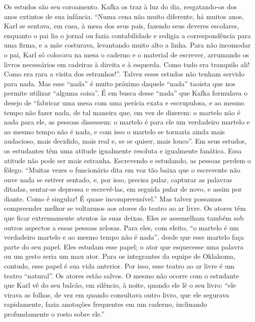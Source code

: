 Os estudos são seu coroamento. Kafka os traz à luz do dia, resgatando-os
dos anos extintos de sua infância. ``Numa cena não muito diferente, há
muitos anos, Karl se sentava, em casa, à mesa dos seus pais, fazendo
seus deveres escolares, enquanto o pai lia o jornal ou fazia
contabilidade e redigia a correspondência para uma firma, e a mãe
costurava, levantando muito alto a linha. Para não incomodar o pai, Karl
só colocava na mesa o caderno e o material de escrever, arrumando os
livros necessários em cadeiras à direita e à esquerda. Como tudo era
tranquilo ali! Como era rara a visita dos estranhos!''. Talvez esses
estudos não tenham servido para nada. Mas esse ``nada'' é muito próximo
daquele ``nada'' taoista que nos permite utilizar ``alguma coisa''. É em
busca desse ``nada'' que Kafka formulava o desejo de ``fabricar uma mesa
com uma perícia exata e escrupulosa, e ao mesmo tempo não fazer nada, de
tal maneira que, em vez de dizerem: o martelo não é nada para ele, as
pessoas dissessem: o martelo é para ele um verdadeiro martelo e ao mesmo
tempo não é nada, e com isso o martelo se tornaria ainda mais audacioso,
mais decidido, mais real e, se se quiser, mais louco''. Em seus estudos,
os estudantes têm uma atitude igualmente resoluta e igualmente fanática.
Essa atitude não pode ser mais estranha. Escrevendo e estudando, as
pessoas perdem o fôlego. ``Muitas vezes o funcionário dita em voz tão
baixa que o escrevente não ouve nada se estiver sentado, e, por isso,
precisa pular, capturar as palavras ditadas, sentar-se depressa e
escrevê-las, em seguida pular de novo, e assim por diante. Como é
singular! É quase incompreensível.'' Mas talvez possamos compreender
melhor se voltarmos aos atores do teatro ao ar livre. Os atores têm que
ficar extremamente atentos às suas deixas. Eles se assemelham também sob
outros aspectos a essas pessoas zelosas. Para eles, com efeito, ``o
martelo é um verdadeiro martelo e ao mesmo tempo não é nada'', desde que
esse martelo faça parte do seu papel. Eles estudam esse papel; o ator
que esquecesse uma palavra ou um gesto seria um mau ator. Para os
integrantes da equipe de Oklahoma, contudo, esse papel é sua vida
anterior. Por isso, esse teatro ao ar livre é um teatro ``natural''. Os
atores estão salvos. O mesmo não ocorre com o estudante que Karl vê do
seu balcão, em silêncio, à noite, quando ele lê o seu livro: ``ele
virava as folhas, de vez em quando consultava outro livro, que ele
segurava rapidamente, fazia anotações frequentes em um caderno,
inclinando profundamente o rosto sobre ele.''

